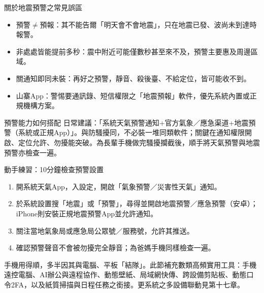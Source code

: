 \begin{tcbwarn}{關於地震預警之常見誤區}
\begin{itemize}
  \item 預警$\neq$預報：其不能告爾「明天會不會地震」，只在地震已發、波尚未到達時報警。
  \item 非處處皆能提前多秒：震中附近可能僅數秒甚至來不及，預警主要惠及周邊區域。
  \item 關通知即同未裝：再好之預警，靜音、殺後臺、不給定位，皆可能收不到。
  \item 山寨App：警惕要通訊錄、短信權限之「地震預報」軟件，優先系統內置或正規機構方案。
\end{itemize}

\end{tcbwarn}

\begin{tcbinfo}{預警能力如何搭配}
日常建議：「系統天氣預警通知+官方氣象／應急渠道+地震預警（系統或正規App）」。與防騷擾同，不必裝一堆同類軟件；關鍵在通知權限開啟、定位允許、勿擾能突破。為長輩手機做完騷擾攔截後，順手將天氣預警與地震預警亦檢查一遍。

\end{tcbinfo}

\begin{tcbpractice}{動手練習：10分鐘檢查預警設置}
\begin{enumerate}
  \item 開系統天氣App，入設定，開啟「氣象預警／災害性天氣」通知。
  \item 於系統設置搜「地震」或「預警」，尋得並開啟地震預警／應急預警（安卓）；iPhone則安裝正規地震預警App並允許通知。
  \item 關注當地氣象局或應急局公眾號／服務號，允許其推送。
  \item 確認預警聲音不會被勿擾完全靜音；為爸媽手機同樣檢查一遍。
\end{enumerate}

\end{tcbpractice}


手機用得順，多半因其與電腦、平板「結隊」。此節補充數類高頻實用工具：手機遠控電腦、AI辦公與遠程協作、動態壁紙、局域網快傳、跨設備剪貼板、動態口令2FA，以及紙質掃描與日程任務之銜接。更系統之多設備聯動見第十七章。


